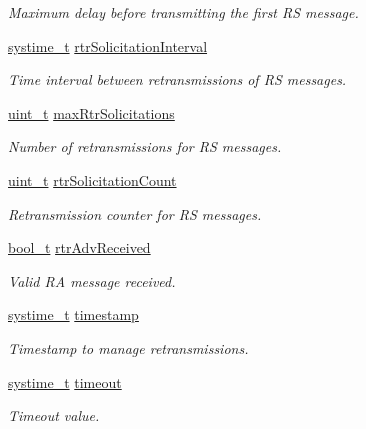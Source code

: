 \begin{DoxyCompactItemize}
\begin{DoxyCompactList}\small\item\em Maximum delay before transmitting the first RS message. \end{DoxyCompactList}\item 
\hyperlink{compiler__port_8h_ae3e32a98d431a02106616da3071832dd}{systime\+\_\+t} \hyperlink{structNdpContext_aeb312645a94a797c2e509c4753562fb4}{rtr\+Solicitation\+Interval}
\begin{DoxyCompactList}\small\item\em Time interval between retransmissions of RS messages. \end{DoxyCompactList}\item 
\hyperlink{compiler__port_8h_a12a1e9b3ce141648783a82445d02b58d}{uint\+\_\+t} \hyperlink{structNdpContext_aceadc715ad12f0148cdba9acba96949a}{max\+Rtr\+Solicitations}
\begin{DoxyCompactList}\small\item\em Number of retransmissions for RS messages. \end{DoxyCompactList}\item 
\hyperlink{compiler__port_8h_a12a1e9b3ce141648783a82445d02b58d}{uint\+\_\+t} \hyperlink{structNdpContext_aa6eac8a31ad5f605018412cbdc75fbee}{rtr\+Solicitation\+Count}
\begin{DoxyCompactList}\small\item\em Retransmission counter for RS messages. \end{DoxyCompactList}\item 
\hyperlink{compiler__port_8h_a812d16e5494522586b3784e55d479912}{bool\+\_\+t} \hyperlink{structNdpContext_af16d6cf8472c6b3827ba500f25458579}{rtr\+Adv\+Received}
\begin{DoxyCompactList}\small\item\em Valid RA message received. \end{DoxyCompactList}\item 
\hyperlink{compiler__port_8h_ae3e32a98d431a02106616da3071832dd}{systime\+\_\+t} \hyperlink{structNdpContext_a141f76af5b53aa964be76110f7c80791}{timestamp}
\begin{DoxyCompactList}\small\item\em Timestamp to manage retransmissions. \end{DoxyCompactList}\item 
\hyperlink{compiler__port_8h_ae3e32a98d431a02106616da3071832dd}{systime\+\_\+t} \hyperlink{structNdpContext_a25bace7e12dfc4b36791709f5cf836ac}{timeout}
\begin{DoxyCompactList}\small\item\em Timeout value. \end{DoxyCompactList}\item 

\end{DoxyCompactItemize}
